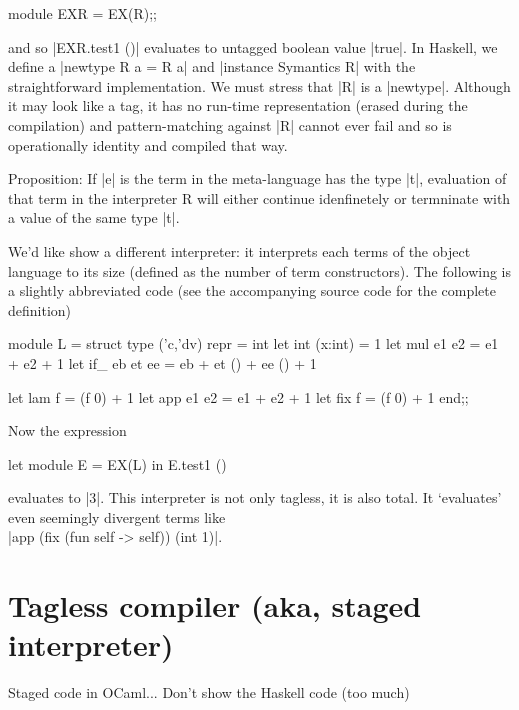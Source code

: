 \documentclass[preprint]{sigplanconf}
\begin{document}
\begin{code}
  module EXR = EX(R);;
\end{code}

and so |EXR.test1 ()| evaluates to untagged boolean value |true|.
In Haskell, we define a |newtype R a = R a| and 
|instance Symantics R|
with the straightforward implementation. We must stress that |R| is
a |newtype|. Although it may look like a tag, it has no run-time
representation (erased during the compilation) and pattern-matching
against |R| cannot ever fail and so is operationally identity and
compiled that way.

Proposition: If |e| is the term in the meta-language has the type
|t|, evaluation of that term in the interpreter R will either continue
idenfinetely or termninate with a value of the same type |t|.

We'd like show a different interpreter: it interprets each terms of
the object language to its size (defined as the number of term
constructors). The following is a slightly abbreviated code (see the
accompanying source code for the complete definition)
 
\begin{code}
module L = struct
  type ('c,'dv) repr = int
  let int (x:int) = 1
  let mul e1 e2 = e1 + e2 + 1
  let if_ eb et ee = eb + et () + ee () + 1

  let lam f = (f 0) + 1
  let app e1 e2 = e1 + e2 + 1
  let fix f = (f 0) + 1
end;;
\end{code}

Now the expression
\begin{code}
  let module E = EX(L) in E.test1 ()
\end{code}
evaluates to |3|. This interpreter is not only tagless, it is also
total. It `evaluates' even seemingly divergent terms like\\
|app (fix (fun self -> self)) (int 1)|.

\begin{comment}
module EX1(S: Symantics) = struct
 open S
 let tfix () = app (fix (fun self -> self)) (int 1)
end;;
let module E =EX1(R) in E.tfix ();;
let module E =EX1(L) in E.tfix ();;
\end{comment}

\section{Tagless compiler (aka, staged interpreter)}
Staged code in OCaml... Don't show the Haskell code (too much)
\end{document}
